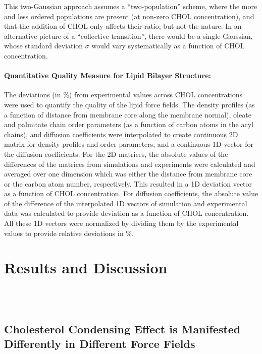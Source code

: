 \documentclass[aps,prl,superscriptaddress]{revtex4-2}
\begin{document}
This two-Gaussian approach assumes a ``two-population'' scheme, where the more and less ordered populations are present (at non-zero CHOL concentration), and that the addition of CHOL only affects their ratio, but not the nature. In an alternative picture of a ``collective transition'', there would be a single Gaussian, whose standard deviation $\sigma$ would vary systematically as a function of CHOL concentration.

\paragraph{Quantitative Quality Measure for Lipid Bilayer Structure:} The deviations (in \%) from experimental values across CHOL concentrations were used to quantify the quality of the lipid force fields. The density profiles (as a function of distance from membrane core along the membrane normal), oleate and palmitate chain order parameters (as a function of carbon atoms in the acyl chains), and diffusion coefficients were interpolated to create continuous 2D matrix for density profiles and order parameters, and a continuous 1D vector for the diffusion coefficients. For the 2D matrices, the absolute values of the differences of the matrices from simulations and experiments were calculated and averaged over one dimension which was either the distance from membrane core or the carbon atom number, respectively. This resulted in a 1D deviation vector as a function of CHOL concentration. For diffusion coefficients, the absolute value of the difference of the interpolated 1D vectors of simulation and experimental data was calculated to provide deviation as a function of CHOL concentration. All these 1D vectors were normalized by dividing them by the experimental values to provide relative deviations in \%.

\section{Results and Discussion}

\\
\\

\subsection{Cholesterol Condensing Effect is Manifested Differently in Different Force Fields}
\end{document}

